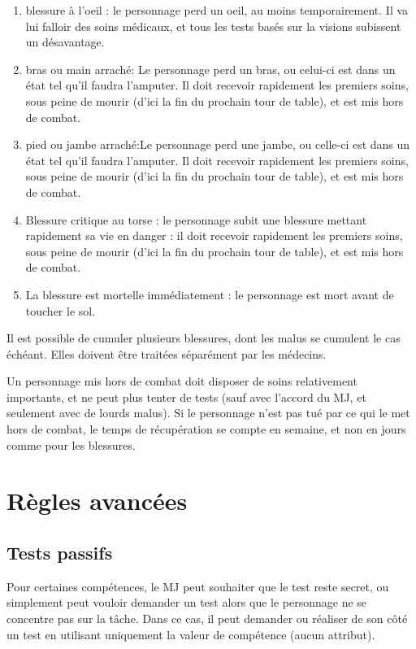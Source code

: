\documentclass{report}
\begin{document}
\begin{multicols}{2}
\begin{enumerate}
    \item blessure à l'oeil : le personnage perd un oeil, au moins temporairement. Il va lui falloir des soins médicaux, et tous les tests basés sur la visions subissent un désavantage.
    \item bras ou main arraché: Le personnage perd un bras, ou celui-ci est dans un état tel qu'il faudra l'amputer. Il doit recevoir rapidement les premiers soins, sous peine de mourir (d'ici la fin du prochain tour de table), et est mis hors de combat.
    \item pied ou jambe arraché:Le personnage perd une jambe, ou celle-ci est dans un état tel qu'il faudra l'amputer. Il doit recevoir rapidement les premiers soins, sous peine de mourir (d'ici la fin du prochain tour de table), et est mis hors de combat.
    \item Blessure critique au torse : le personnage subit une blessure mettant rapidement sa vie en danger : il doit recevoir rapidement les premiers soins, sous peine de mourir (d'ici la fin du prochain tour de table), et est mis hors de combat.
    \item La blessure est mortelle immédiatement : le personnage est mort avant de toucher le sol.
\end{enumerate}

Il est possible de cumuler plusieurs blessures, dont les malus se cumulent le cas échéant. Elles doivent être traitées séparément par les médecins.

Un personnage mis hors de combat doit disposer de soins relativement importants, et ne peut plus tenter de tests (sauf avec l'accord du MJ, et seulement avec de lourds malus). Si le personnage n'est pas tué par ce qui le met hors de combat, le temps de récupération se compte en semaine, et non en jours comme pour les blessures.


\chapter{Règles avancées}
\section{Tests passifs}
Pour certaines compétences, le MJ peut souhaiter que le test reste secret, ou simplement peut vouloir demander un test alors que le personnage ne se concentre pas sur la tâche. Dans ce cas, il peut demander ou réaliser de son côté un test en utilisant uniquement la valeur de compétence (aucun attribut). 


\end{multicols}
\end{document}
